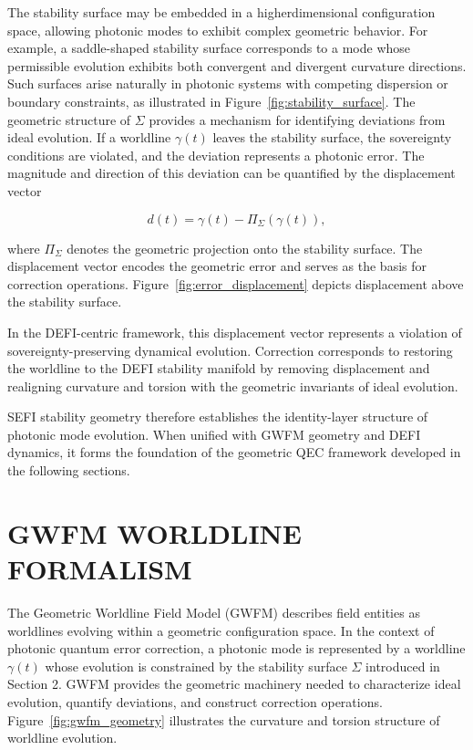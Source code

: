 \documentclass[aip,adv,reprint,floatfix]{revtex4-2}
\begin{document}
The stability surface may be embedded in a higherdimensional configuration space, allowing photonic
modes to exhibit complex geometric behavior.\cite{DuttonElectronField2026}
For example, a saddle-shaped stability surface corresponds to a
mode whose permissible evolution exhibits both convergent and divergent curvature directions.
Such surfaces arise naturally in photonic systems with competing dispersion or boundary constraints,
 as illustrated in Figure~\ref{fig:stability_surface}.
The geometric structure of $\Sigma$ provides a mechanism for
identifying deviations from ideal evolution. If a worldline
$\gamma(t)$ leaves the stability surface, the sovereignty conditions are violated, and the deviation represents a photonic error. The magnitude and direction of this deviation can be quantified by the displacement vector


\[
d(t) = \gamma(t) - \Pi_{\Sigma}(\gamma(t)),
\]


where $\Pi_{\Sigma}$ denotes the geometric projection onto the stability surface.\cite{DuttonElectronField2026} The displacement vector encodes the geometric error and serves as the basis for correction operations. Figure~\ref{fig:error_displacement} depicts displacement above the stability surface. 

In the DEFI-centric framework, this displacement vector represents a violation of sovereignty-preserving dynamical evolution.\cite{DuttonSEFI2026} Correction corresponds to restoring
the worldline to the DEFI stability manifold by removing
displacement and realigning curvature and torsion with
the geometric invariants of ideal evolution.

SEFI stability geometry therefore establishes the
identity-layer structure of photonic mode evolution.
When unified with GWFM geometry and DEFI dynamics, it forms the foundation of the geometric QEC framework developed in the following sections.
\section{GWFM WORLDLINE FORMALISM}

The Geometric Worldline Field Model (GWFM) describes field entities as worldlines evolving within a geometric configuration space.\cite{DuttonElectronField2026} In the context of photonic
quantum error correction, a photonic mode is represented
by a worldline $\gamma(t)$ whose evolution is constrained by
the stability surface $\Sigma$ introduced in Section 2. GWFM
provides the geometric machinery needed to characterize
ideal evolution, quantify deviations, and construct correction operations. Figure~\ref{fig:gwfm_geometry} illustrates
the curvature and torsion structure of worldline evolution.
\end{document}
